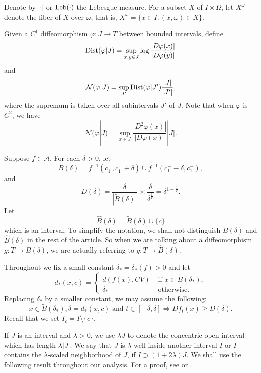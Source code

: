 \documentclass[11pt,oneside]{article}
\theoremstyle{plain}
\numberwithin{equation}{section}
\numberwithin{figure}{section}
\numberwithin{table}{section}
\begin{document}
Denote by $| \cdot |$ or ${\rm Leb}( \cdot )$ the Lebesgue measure. For a subset $X$ of $I \times \Omega$, let $X^{\omega}$ denote the fiber of $X$ over $\omega$, that is, $X^{\omega} = \{ x \in I :  (x, \omega) \in X\}$.


Given a $C^1$ diffeomorphism $\varphi: J \to T$ between bounded intervals, define
\[
{\rm Dist}(\varphi|J) = \sup_{x, y \in J} \log \frac{|D\varphi(x)|}{|D\varphi(y)|}
\]
and
\[
\mathcal N(\varphi|J) = \sup_{J'} {\rm Dist}(\varphi | J') \frac{|J|}{|J'|},
\]
where the supremum is taken over all subintervals $J'$ of $J$. Note that when $\varphi$ is $C^2$, we have
\[
\mathcal N(\varphi|J) = \sup_{x \in J} \frac{|D^2\varphi(x)|}{|D\varphi(x)|} |J|.
\]


Suppose $f \in \mathcal A$. For each $\delta >0$, let
\[
\tilde B(\delta) = f^{-1} (c_1^+, c_1^+ + \delta) \cup f^{-1} (c_1^- - \delta, c_1^-),
\]
and 
\[
D(\delta) = \frac{\delta}{|\tilde B(\delta)|} \asymp \frac{\delta}{\delta^{\frac{1}{\ell}}} = \delta^{1 - \frac{1}{\ell}}.
\]
Let
\[
\hat B(\delta) = \tilde B(\delta) \cup \{ c\}
\]
which is an interval. To simplify the notation, we shall not distinguish $\tilde B(\delta)$ and $\hat B(\delta)$ in the rest of the article. So when we are talking about a diffeomorphism $g : T \to \tilde B(\delta)$, we are actually referring to $g : T \to \hat B(\delta)$.


Throughout we fix a small constant $\delta_* = \delta_*(f)>0$ and let
\[
d_*(x, c) = \begin{cases}
d(f(x), CV) & \text{ if } x \in \tilde B(\delta_*),\\
\delta_* & \text{ otherwise}.
\end{cases}
\] 
Replacing $\delta_*$ by a smaller constant, we may assume the following:
\begin{equation}
x \in \tilde B(\delta_*), \delta = d_*(x, c) \text{ and } t \in [-\delta, \delta] \Longrightarrow Df_t(x) \geq D(\delta).
\end{equation}
Recall that we set $I_c = I \setminus \{ c\}$.


If $J$ is an interval and $\lambda >0$, we use $\lambda J$ to denote the concentric open interval which has length $\lambda |J|$. We say that $J$ is $\lambda$-well-inside another interval $I$ or $I$ contains the $\lambda$-scaled neighborhood of $J$, if $I \supset (1 + 2 \lambda) J$. We shall use the following result throughout our analysis. For a proof, see \cite{BRSS} or  \cite{MS}.
\end{document}
